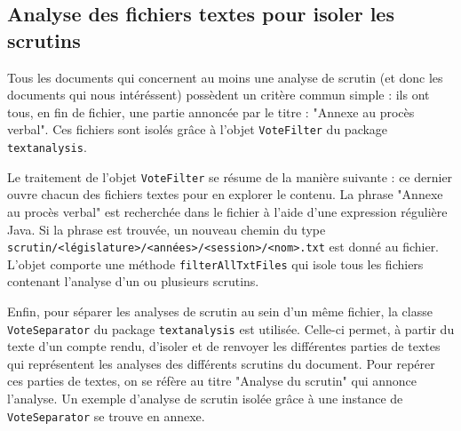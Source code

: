 \subsection{Analyse des fichiers textes pour isoler les scrutins}

Tous les documents qui concernent au moins une analyse de scrutin (et donc les documents qui nous intéréssent) possèdent un critère commun simple : ils ont tous, en fin de fichier, une partie annoncée par le titre : "Annexe au procès verbal". Ces fichiers sont isolés grâce à l'objet \verb|VoteFilter| du package \verb|textanalysis|.

Le traitement de l'objet \verb|VoteFilter| se résume de la manière suivante : ce dernier ouvre chacun des fichiers textes pour en explorer le contenu. La phrase "Annexe au procès verbal" est recherchée dans le fichier à l'aide d'une expression régulière Java. Si la phrase est trouvée, un nouveau chemin du type \verb|scrutin/<législature>/<années>/<session>/<nom>.txt| est donné au fichier. L'objet comporte une méthode \verb|filterAllTxtFiles| qui isole tous les fichiers contenant l'analyse d'un ou plusieurs scrutins.

Enfin, pour séparer les analyses de scrutin au sein d'un même fichier, la classe \verb|VoteSeparator| du package \verb|textanalysis| est utilisée. Celle-ci permet, à partir du texte d'un compte rendu, d'isoler et de renvoyer les différentes parties de textes qui représentent les analyses des différents scrutins du document. Pour repérer ces parties de textes, on se réfère au titre "Analyse du scrutin" qui annonce l'analyse.\newline
Un exemple d'analyse de scrutin isolée grâce à une instance de \verb|VoteSeparator| se trouve en annexe.
